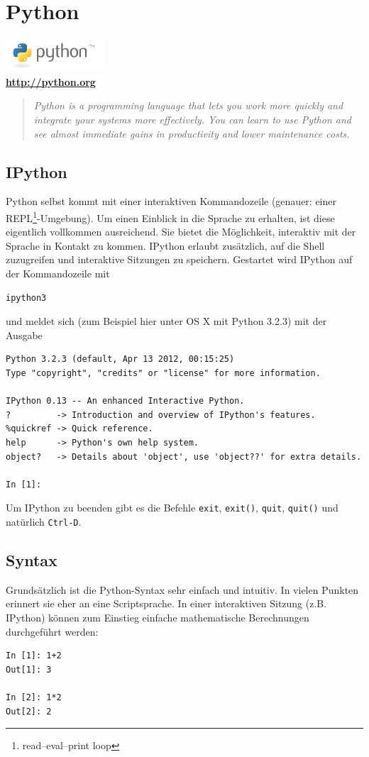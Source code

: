 \chapter{Python}
\begin{center}
  \includegraphics[width=140px]{img/python.png} \\
  \textbf{\url{http://python.org}}
\end{center}
\begin{quote}
    \textit{Python is a programming language that lets you work more quickly and integrate your systems more effectively.
            You can learn to use Python and see almost immediate gains in productivity and lower maintenance costs.}
\end{quote}

\section{IPython}
Python selbst kommt mit einer interaktiven Kommandozeile (genauer: einer REPL\footnote{read–eval–print loop}-Umgebung).
Um einen Einblick in die Sprache zu erhalten, ist diese eigentlich vollkommen ausreichend.
Sie bietet die Möglichkeit, interaktiv mit der Sprache in Kontakt zu kommen.
IPython erlaubt zusätzlich, auf die Shell zuzugreifen und interaktive Sitzungen zu speichern.
Gestartet wird IPython auf der Kommandozeile mit
\begin{verbatim}
ipython3
\end{verbatim}
und meldet sich (zum Beispiel hier unter OS X mit Python 3.2.3) mit der Ausgabe
\begin{verbatim}
Python 3.2.3 (default, Apr 13 2012, 00:15:25) 
Type "copyright", "credits" or "license" for more information.

IPython 0.13 -- An enhanced Interactive Python.
?         -> Introduction and overview of IPython's features.
%quickref -> Quick reference.
help      -> Python's own help system.
object?   -> Details about 'object', use 'object??' for extra details.

In [1]: 
\end{verbatim}
Um IPython zu beenden gibt es die Befehle \texttt{exit}, \texttt{exit()}, \texttt{quit}, \texttt{quit()} und natürlich \texttt{Ctrl-D}.

\section{Syntax}
Grundsätzlich ist die Python-Syntax sehr einfach und intuitiv.
In vielen Punkten erinnert sie eher an eine Scriptsprache.
In einer interaktiven Sitzung (z.B. IPython) können zum Einstieg einfache mathematische Berechnungen durchgeführt werden:
\begin{verbatim}
In [1]: 1+2
Out[1]: 3

In [2]: 1*2
Out[2]: 2
\end{verbatim}

